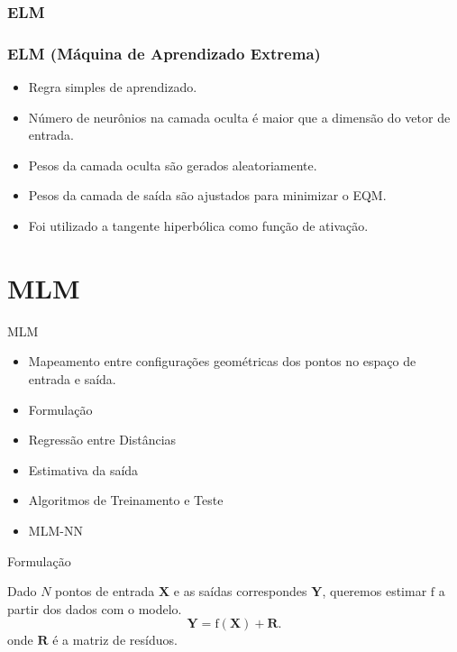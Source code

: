 \documentclass{beamer}
\begin{document}

\subsubsection{ELM}
\begin{frame}\frametitle{ELM (Máquina de Aprendizado Extrema)}

	\begin{itemize}
		\item Regra simples de aprendizado.
		\item Número de neurônios na camada oculta é maior que a dimensão do vetor de entrada.
		\item Pesos da camada oculta são gerados aleatoriamente.
		\item Pesos da camada de saída são ajustados para minimizar o EQM.
		\item Foi utilizado a tangente hiperbólica como função de ativação.
	\end{itemize}
	
\end{frame}


\section{MLM}

\begin{frame}{MLM}

	\begin{itemize}
		\item[] Mapeamento entre configurações geométricas dos pontos no espaço de entrada e saída.
	\end{itemize}

	\begin{itemize}
		\item Formulação
		\item Regressão entre Distâncias
		\item Estimativa da saída
		\item Algoritmos de Treinamento e Teste
		\item MLM-NN
	\end{itemize}

\end{frame}

\begin{frame}{Formulação}

Dado $N$ pontos de entrada $\mathbf{X} $ e as saídas correspondes $\mathbf{Y} $, queremos estimar $\mathrm{f}$ a partir dos dados com o modelo.
\begin{equation*}
%
\mathbf{Y} = \mathrm{f}(\mathbf{X}) + \mathbf{R}.
%
\end{equation*}
onde $\mathbf{R} $ é a matriz de resíduos.


\end{frame}
\end{document}
